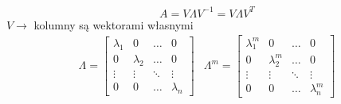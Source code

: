 \documentclass[a4paper,12pt]{article}
\theoremstyle{definition}%
\theoremstyle{definition}
\theoremstyle{problem}
\begin{document}
$$A=V\Lambda V^{-1}=V\Lambda V^T$$
$V\rightarrow $ kolumny są wektorami własnymi
\begin{align*}
\Lambda = \begin{bmatrix}
\lambda _1 & 0 & \dots & 0\\
0 & \lambda _2 & \dots & 0 \\
\vdots & \vdots & \ddots & \vdots \\
0 & 0 & \dots & \lambda _n
\end{bmatrix} & \Lambda ^m =\begin{bmatrix}
\lambda _1^m & 0 & \dots & 0\\
0 & \lambda _2^m & \dots & 0 \\
\vdots & \vdots & \ddots & \vdots \\
0 & 0 & \dots & \lambda _n^m
\end{bmatrix}
\end{align*}

\end{document}
